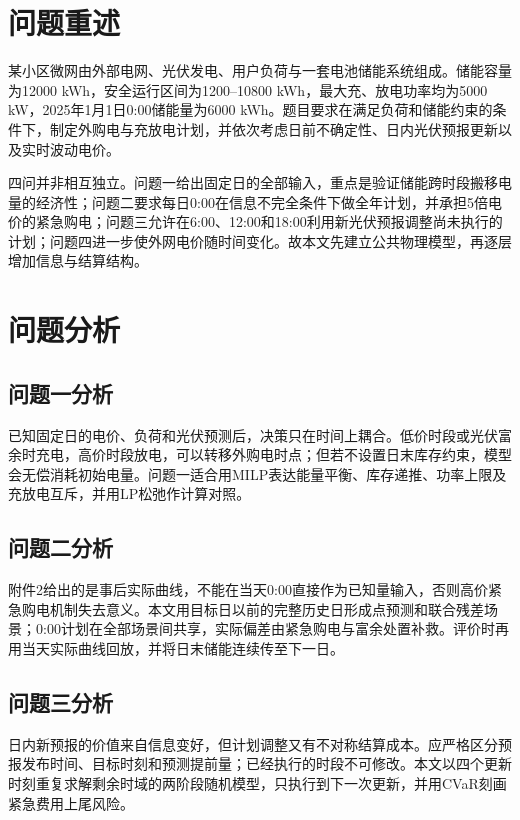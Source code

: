 \section{问题重述}

某小区微网由外部电网、光伏发电、用户负荷与一套电池储能系统组成。储能容量为12000 kWh，安全运行区间为1200--10800 kWh，最大充、放电功率均为5000 kW，2025年1月1日0:00储能量为6000 kWh。题目要求在满足负荷和储能约束的条件下，制定外购电与充放电计划，并依次考虑日前不确定性、日内光伏预报更新以及实时波动电价。

四问并非相互独立。问题一给出固定日的全部输入，重点是验证储能跨时段搬移电量的经济性；问题二要求每日0:00在信息不完全条件下做全年计划，并承担5倍电价的紧急购电；问题三允许在6:00、12:00和18:00利用新光伏预报调整尚未执行的计划；问题四进一步使外网电价随时间变化。故本文先建立公共物理模型，再逐层增加信息与结算结构。

\section{问题分析}

\subsection{问题一分析}

已知固定日的电价、负荷和光伏预测后，决策只在时间上耦合。低价时段或光伏富余时充电，高价时段放电，可以转移外购电时点；但若不设置日末库存约束，模型会无偿消耗初始电量。问题一适合用MILP表达能量平衡、库存递推、功率上限及充放电互斥，并用LP松弛作计算对照。

\subsection{问题二分析}

附件2给出的是事后实际曲线，不能在当天0:00直接作为已知量输入，否则高价紧急购电机制失去意义。本文用目标日以前的完整历史日形成点预测和联合残差场景；0:00计划在全部场景间共享，实际偏差由紧急购电与富余处置补救。评价时再用当天实际曲线回放，并将日末储能连续传至下一日。

\subsection{问题三分析}

日内新预报的价值来自信息变好，但计划调整又有不对称结算成本。应严格区分预报发布时间、目标时刻和预测提前量；已经执行的时段不可修改。本文以四个更新时刻重复求解剩余时域的两阶段随机模型，只执行到下一次更新，并用CVaR刻画紧急费用上尾风险。

